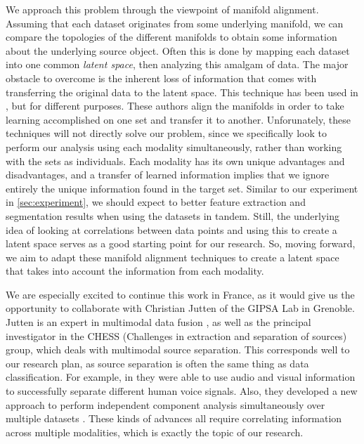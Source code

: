 \documentclass{article}[11pt]
\begin{document}
We approach this problem through the viewpoint of manifold alignment. Assuming
that each dataset originates from some underlying manifold, we can compare the
topologies of the different manifolds to obtain some information about the
underlying source object. Often this is done by mapping each dataset into one
common \emph{latent space}, then analyzing this amalgam of data. The major
obstacle to overcome is the inherent loss of information that comes with
transferring the original data to the latent space. This technique has been used
in \cite{Yang13,Wang11,Yeh14}, but for different purposes. These authors align
the manifolds in order to take learning accomplished on one set and transfer it
to another. Unforunately, these techniques will not directly solve our problem,
since we specifically look to perform our analysis using each modality
simultaneously, rather than working with the sets as individuals. Each modality
has its own unique advantages and disadvantages, and a transfer of learned
information implies that we ignore entirely the unique information found in the
target set. Similar to our experiment in \ref{sec:experiment}, we should expect
to better feature extraction and segmentation results when using the datasets in
tandem.  Still, the underlying idea of looking at correlations between data
points and using this to create a latent space serves as a good starting point
for our research. So, moving forward, we aim to adapt these manifold alignment
techniques to create a latent space that takes into account the
information from each modality.

We are especially excited to continue this work in France, as it would give us
the opportunity to collaborate with Christian Jutten of the GIPSA Lab in
Grenoble. Jutten is an expert in multimodal data fusion
\cite{lahat:hal-01062366}, as well as the principal investigator in the CHESS
(Challenges in extraction and separation of sources) group, which deals with
multimodal source separation. This corresponds well to our research plan, as
source separation is often the same thing as data classification. For example,
in \cite{sedighin:hal-01400542} they were able to use audio and visual
information to successfully separate different human voice signals. Also, they
developed a new approach to perform independent component analysis
simultaneously over multiple datasets \cite{lahat:hal-01351209}. These kinds of
advances all require correlating information across multiple modalities, which
is exactly the topic of our research.


 
\end{document}
